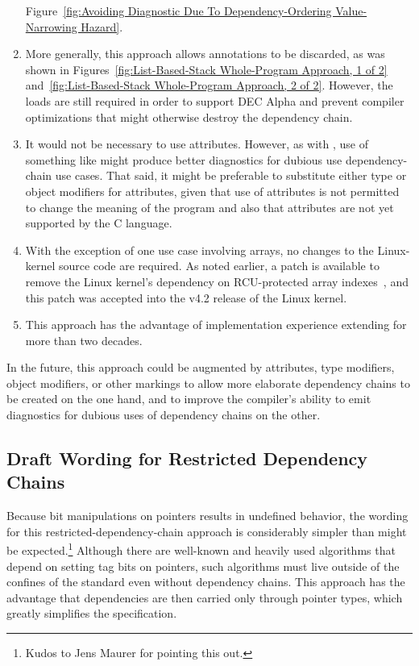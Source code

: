 \documentclass[letterpaper,twocolumn,10pt]{article}
\begin{document}
\begin{enumerate}
	Figure~\ref{fig:Avoiding Diagnostic Due To Dependency-Ordering Value-Narrowing Hazard}.
\item	More generally, this approach allows annotations to be discarded,
	as was shown in
	Figures~\ref{fig:List-Based-Stack Whole-Program Approach, 1 of 2}
	and~\ref{fig:List-Based-Stack Whole-Program Approach, 2 of 2}.
	However, the  loads are still required
	in order to support DEC Alpha and prevent compiler optimizations
	that might otherwise destroy the dependency chain.
\item	It would not be necessary to use 
	attributes.
	However, as with , use of something like
	 might produce better diagnostics for
	dubious use dependency-chain use cases.
	That said, it might be preferable to substitute either type or
	object modifiers for attributes, given that use of attributes is
	not permitted to change the meaning of the program and also that
	attributes are not yet supported by the C language.
\item	With the exception of one use case involving arrays,
	no changes to the Linux-kernel source code are required.
	As noted earlier, a patch is available to remove the Linux
	kernel's dependency on RCU-protected array
	indexes~\cite{PaulEMcKenney2015NoRCUArrayIndex},
	and this patch was accepted into the v4.2 release of the
	Linux kernel.
\item	This approach has the advantage of implementation experience
	extending for more than two decades.
\end{enumerate}

In the future, this approach could be augmented by attributes, type
modifiers, object modifiers, or other markings to allow more elaborate
dependency chains to be created on the one hand, and to improve the
compiler's ability to emit diagnostics for dubious uses of dependency
chains on the other.

\subsection{Draft Wording for Restricted Dependency Chains}
\label{sec:Draft Wording for Restricted Dependency Chains}

Because bit manipulations on pointers results in undefined behavior,
the wording for this restricted-dependency-chain approach is considerably
simpler than might be expected.\footnote{
	Kudos to Jens Maurer for pointing this out.}
Although there are well-known and heavily used algorithms that depend
on setting tag bits on pointers, such algorithms must live outside of
the confines of the standard even without dependency chains.
This approach has the advantage that dependencies are then carried
only through pointer types, which greatly simplifies the specification.
\end{document}
